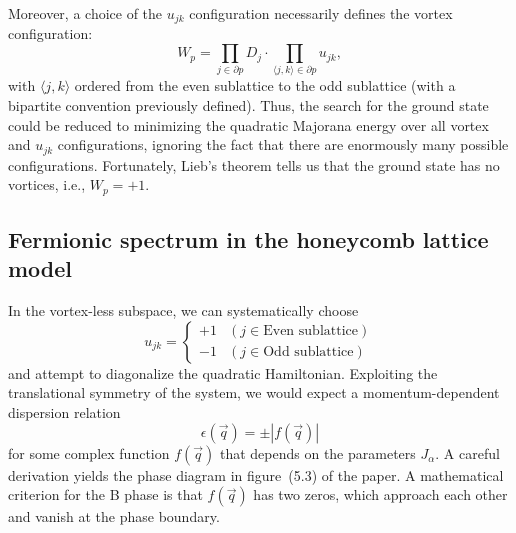 \documentclass{article}
\begin{document}
Moreover, a choice of the $u_{jk}$ configuration necessarily defines the vortex configuration:
\[
    W_p = \prod_{j \in \partial p} D_j \cdot \prod_{\langle j, k\rangle \in \partial p} u_{jk},
\]
with $\langle j, k\rangle$ ordered from the even sublattice to the odd sublattice
(with a bipartite convention previously defined).
Thus, the search for the ground state could be reduced to
minimizing the quadratic Majorana energy over all vortex and $u_{jk}$ configurations,
ignoring the fact that there are enormously many possible configurations.
Fortunately, Lieb's theorem tells us that the ground state has no vortices, i.e., $W_p = +1$.

\subsection{Fermionic spectrum in the honeycomb lattice model}
In the vortex-less subspace, we can systematically choose
\[
    u_{jk} = \begin{cases}
        +1 & (j \in \text{Even sublattice}) \\
        -1 & (j \in \text{Odd sublattice})
    \end{cases}
\]
and attempt to diagonalize the quadratic Hamiltonian.
Exploiting the translational symmetry of the system,
we would expect a momentum-dependent dispersion relation
\[
    \epsilon(\vec{q}) = \pm |f(\vec{q})|
\]
for some complex function $f(\vec{q})$ that depends on the parameters $J_\alpha$.
A careful derivation yields the phase diagram in figure~(5.3) of the paper.
A mathematical criterion for the B phase is that $f(\vec{q})$ has two zeros,
which approach each other and vanish at the phase boundary.
\end{document}
